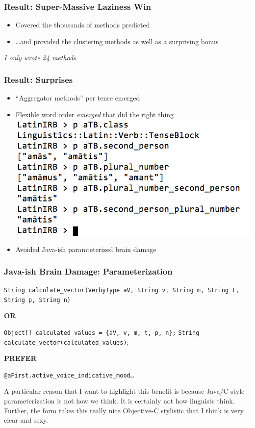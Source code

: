 \documentclass[slidestop,compress,mathserif]{beamer}
\begin{document}
\begin{frame}
	\frametitle{Result:  Super-Massive Laziness Win}
	\begin{itemize}
		\item Covered the thousands of methods predicted
		\pause
		\item \ldots and provided the clustering methods as well as a surprising bonus
	\end{itemize}
	\pause
	\vskip 0.5cm
	\emph{I only wrote 24 methods}
\end{frame}

\begin{frame}
	\frametitle{Result:  Surprises}
	\begin{itemize}
		\item ``Aggregator methods'' per tense emerged
		\item Flexible word order \emph{emerged} that did the right thing
		\includegraphics[scale=0.38]{img/conj_subspec.png}
		\pause
		\item Avoided Java-ish paramteterized brain damage
	\end{itemize}
\end{frame}


\begin{frame}
	\frametitle{Java-ish Brain Damage:  Parameterization}
 	\texttt{String calculate\_vector(VerbyType aV, String v, String m, String t, String p, String n)}
	\vskip 0.5cm

	\begin{center}
		\textbf{OR}
	\end{center}

	\vskip 0.5cm
	\texttt{Object[] calculated\_values = \{aV, v, m, t, p, n\};}
	\texttt{String calculate\_vector(calculated\_values)};
	\vskip 0.5cm

	\begin{center}
		\textbf{PREFER}
	\end{center}

	\vskip 0.5cm
	\texttt{@aFirst.active\_voice\_indicative\_mood{\ldots}}
\end{frame}
\note
{A particular reason that I want to highlight this benefit is because
Java/C-style parameterization is not how we think. It is certainly not how
linguists think. Further, the form takes this really nice Objective-C
stylistic that I think is very clear and sexy.
}
\end{document}
